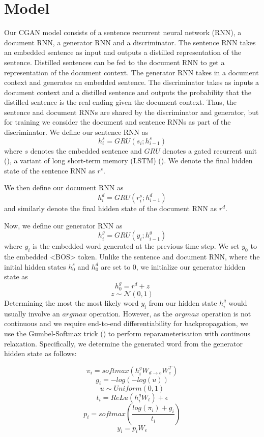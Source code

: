 \documentclass{article}
\begin{document}
\section{Model}
Our CGAN model consists of a sentence recurrent neural network (RNN), a document RNN, a generator RNN and a discriminator. The sentence RNN takes an embedded sentence as input and outputs a distilled representation of the sentence. Distilled sentences can be fed to the document RNN to get a representation of the document context. The generator RNN takes in a document context and generates an embedded sentence. The discriminator takes as inputs a document context and a distilled sentence and outputs the probability that the distilled sentence is the real ending given the document context. Thus, the sentence and document RNNs are shared by the discriminator and generator, but for training we consider the document and sentence RNNs as part of the discriminator.
We define our sentence RNN as
$$ h^{s}_{i} = GRU(s_{i}; h^{s}_{i-1})$$
where $s$ denotes the embedded sentence and $GRU$ denotes a gated recurrent unit (\cite{DBLP:journals/corr/ChoMGBSB14}), a variant of long short-term memory (LSTM) (\cite{articffle}). We denote the final hidden state of the sentence RNN as $r^{s}$.

We then define our document RNN as
$$ h^{d}_{i} = GRU(r^{s}_{i}; h^{d}_{i-1}) $$
and similarly denote the final hidden state of the document RNN as $r^{d}$.

Now, we define our generator RNN as
$$ h^{g}_{i} = GRU(y_{i}; h^{g}_{i-1}) $$
where $y_{i}$ is the embedded word generated at the previous time step. We set $y_{0}$ to the embedded <BOS> token. Unlike the sentence and document RNN, where the initial hidden states $h^{s}_{0}$ and $h^{d}_{0}$ are set to 0, we initialize our generator hidden state as
$$ h^{g}_{0} = r^{d} + z $$
$$ z \sim \mathcal{N}(0,1) $$
Determining the most the most likely word $y_{i}$ from our hidden state $h^{g}_{i}$ would usually involve an $argmax$ operation. However, as the $argmax$ operation is not continuous and we require end-to-end differentiability for backpropagation, we use the Gumbel-Softmax trick (\cite{2016arXiv161101144J}) to perform reparameterisation with continous relaxation. Specifically, we determine the generated word from the generator hidden state as follows:

$$ \pi_{i} = softmax(h^{g}_{i}W_{d \rightarrow e}W_{e}^{T})$$
$$ g_{i} = -log(-log(u)) $$
$$ u \sim Uniform(0,1) $$
$$ t_{i} = ReLu(h^{g}_{i}W_{t}) + \epsilon $$
$$ p_{i} = softmax(\frac{log(\pi_{i}) + g_{i}}{t_{i}}) $$
$$ y_{i} = p_{i}W_{e}$$
\end{document}
